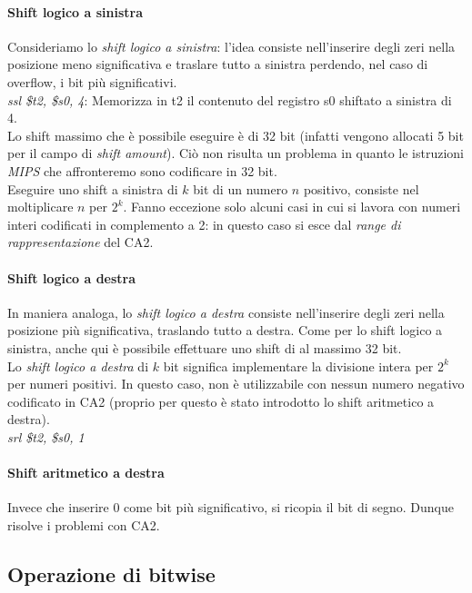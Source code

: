 \documentclass[class=book, crop=false]{standalone}
\begin{document}
\paragraph{Shift logico a sinistra}
Consideriamo lo \emph{shift logico a sinistra}: l'idea consiste nell'inserire degli zeri nella posizione meno significativa e traslare tutto a sinistra perdendo, nel caso di overflow, i bit più significativi.\\
\emph{ssl \$t2, \$s0, 4}: Memorizza in t2 il contenuto del registro s0 shiftato a sinistra di 4.\\
Lo shift massimo che è possibile eseguire è di 32 bit (infatti vengono allocati 5 bit per il campo di \emph{shift amount}). Ciò non risulta un problema in quanto le istruzioni \emph{MIPS} che affronteremo sono codificare in 32 bit.\\
Eseguire uno shift a sinistra di \(k\) bit di un numero \(n\) positivo, consiste nel moltiplicare \(n\) per \(2^k\). Fanno eccezione solo alcuni casi in cui si lavora con numeri interi codificati in complemento a 2: in questo caso si esce dal \emph{range di rappresentazione} del CA2.

\paragraph{Shift logico a destra}
In maniera analoga, lo \emph{shift logico a destra} consiste nell'inserire degli zeri nella posizione più significativa, traslando tutto a destra. Come per lo shift logico a sinistra, anche qui è possibile effettuare uno shift di al massimo 32 bit.\\
Lo \emph{shift logico a destra} di \(k\) bit significa implementare la divisione intera per \(2^k\) per numeri positivi. In questo caso, non è utilizzabile con nessun numero negativo codificato in CA2 (proprio per questo è stato introdotto lo shift aritmetico a destra).\\
\emph{srl \$t2, \$s0, 1}

\paragraph{Shift aritmetico a destra}
Invece che inserire 0 come bit più significativo, si ricopia il bit di segno. Dunque risolve i problemi con CA2.


\subsection{Operazione di bitwise}
\end{document}
